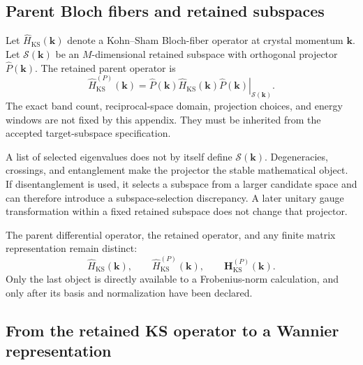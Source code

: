\subsection{Parent Bloch fibers and retained subspaces}

Let $\hat H_{\mathrm{KS}}(\mathbf k)$ denote a Kohn--Sham Bloch-fiber
operator at crystal momentum $\mathbf k$. Let
$\mathcal S(\mathbf k)$ be an $M$-dimensional retained subspace with
orthogonal projector $\hat P(\mathbf k)$. The retained parent operator is
\begin{equation}
    \hat H_{\mathrm{KS}}^{(P)}(\mathbf k)
    =
    \left.
        \hat P(\mathbf k)
        \hat H_{\mathrm{KS}}(\mathbf k)
        \hat P(\mathbf k)
    \right|_{\mathcal S(\mathbf k)}.
\end{equation}
The exact band count, reciprocal-space domain, projection choices, and energy
windows are not fixed by this appendix. They must be inherited from the accepted
target-subspace specification.

A list of selected eigenvalues does not by itself define
$\mathcal S(\mathbf k)$. Degeneracies, crossings, and entanglement make the
projector the stable mathematical object. If disentanglement is used, it
selects a subspace from a larger candidate space and can therefore introduce a
subspace-selection discrepancy. A later unitary gauge transformation within a
fixed retained subspace does not change that projector.

The parent differential operator, the retained operator, and any finite matrix
representation remain distinct:
\begin{equation}
    \hat H_{\mathrm{KS}}(\mathbf k),
    \qquad
    \hat H_{\mathrm{KS}}^{(P)}(\mathbf k),
    \qquad
    \mathbf H_{\mathrm{KS}}^{(P)}(\mathbf k).
\end{equation}
Only the last object is directly available to a Frobenius-norm calculation,
and only after its basis and normalization have been declared.

\subsection{From the retained KS operator to a Wannier representation}

